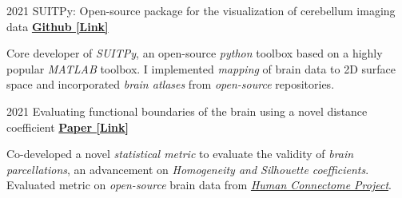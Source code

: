 

\begin{cventries}
    
  \cventry
    {2021} %
  	{SUITPy: Open-source package for the visualization of cerebellum imaging data} %
  	{\href{https://github.com/DiedrichsenLab/SUITPy}{\textbf{Github [Link]}}}
  	{}
    {
      \begin{cvitems} %
      	\item {Core developer of \textit{SUITPy}, an open-source \textit{python} toolbox based on a highly popular \textit{MATLAB} toolbox. I implemented \textit{mapping} of brain data to 2D surface space and incorporated \textit{brain atlases} from \textit{open-source} repositories.}
      \end{cvitems}
    }
    
  \cventry
    {2021} %
    {Evaluating functional boundaries of the brain using a novel distance coefficient} %
    {\href{https://www.biorxiv.org/content/10.1101/2021.05.11.443151v1.full.pdf}{\textbf{Paper [Link]}}}
    {}
    {
      \begin{cvitems} %
        \item {Co-developed a novel \textit{statistical metric} to evaluate the validity of \textit{brain parcellations}, an advancement on \textit{Homogeneity and Silhouette coefficients}. Evaluated metric on \textit{open-source} brain data from \href{http://www.humanconnectomeproject.org/}{\textit{Human Connectome Project}}.}
      \end{cvitems}
    }
    

\end{cventries}
